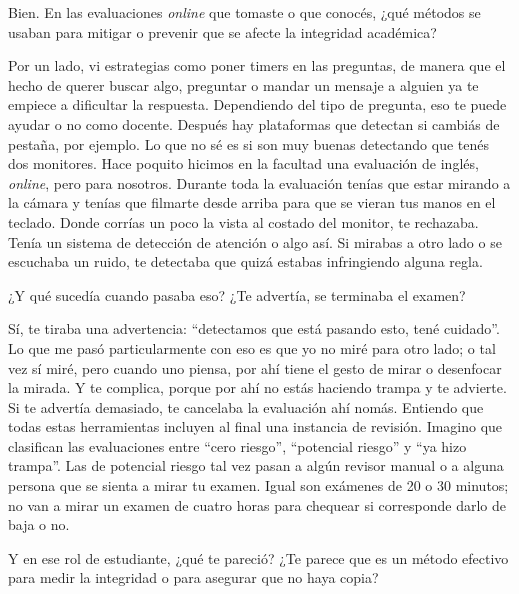 \begin{description}[leftmargin=0cm, labelsep=0.5cm, style=nextline]
\item[\textbf{Entrevistadores:}] Bien. En las evaluaciones \textit{online} que tomaste o que conocés, ¿qué métodos se usaban para mitigar o prevenir que se afecte la integridad académica?
\item[\textbf{Entrevistado:}] Por un lado, vi estrategias como poner timers en las preguntas, de manera que el hecho de querer buscar algo, preguntar o mandar un mensaje a alguien ya te empiece a dificultar la respuesta. Dependiendo del tipo de pregunta, eso te puede ayudar o no como docente. Después hay plataformas que detectan si cambiás de pestaña, por ejemplo. Lo que no sé es si son muy buenas detectando que tenés dos monitores. Hace poquito hicimos en la facultad una evaluación de inglés, \textit{online}, pero para nosotros. Durante toda la evaluación tenías que estar mirando a la cámara y tenías que filmarte desde arriba para que se vieran tus manos en el teclado. Donde corrías un poco la vista al costado del monitor, te rechazaba. Tenía un sistema de detección de atención o algo así. Si mirabas a otro lado o se escuchaba un ruido, te detectaba que quizá estabas infringiendo alguna regla.
\item[\textbf{Entrevistadores:}] ¿Y qué sucedía cuando pasaba eso? ¿Te advertía, se terminaba el examen?
\item[\textbf{Entrevistado:}] Sí, te tiraba una advertencia: ``detectamos que está pasando esto, tené cuidado''. Lo que me pasó particularmente con eso es que yo no miré para otro lado; o tal vez sí miré, pero cuando uno piensa, por ahí tiene el gesto de mirar o desenfocar la mirada. Y te complica, porque por ahí no estás haciendo trampa y te advierte. Si te advertía demasiado, te cancelaba la evaluación ahí nomás. Entiendo que todas estas herramientas incluyen al final una instancia de revisión. Imagino que clasifican las evaluaciones entre ``cero riesgo'', ``potencial riesgo'' y ``ya hizo trampa''. Las de potencial riesgo tal vez pasan a algún revisor manual o a alguna persona que se sienta a mirar tu examen. Igual son exámenes de 20 o 30 minutos; no van a mirar un examen de cuatro horas para chequear si corresponde darlo de baja o no.
\item[\textbf{Entrevistadores:}] Y en ese rol de estudiante, ¿qué te pareció? ¿Te parece que es un método efectivo para medir la integridad o para asegurar que no haya copia?

\end{description}
